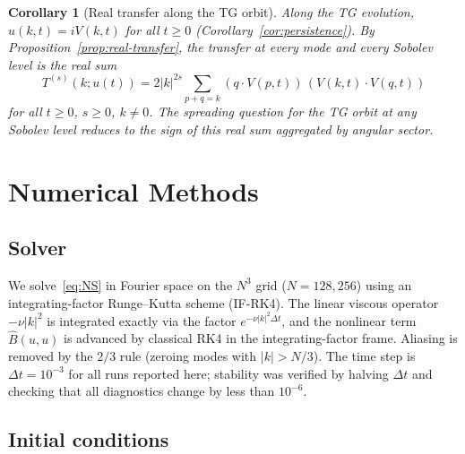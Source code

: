 \documentclass[11pt]{article}
\newtheorem{corollary}[theorem]{Corollary}
\theoremstyle{definition}
\begin{document}
\begin{corollary}[Real transfer along the TG orbit]
\label{cor:TG-real-orbit}
Along the TG evolution, $\hat u(k,t)=iV(k,t)$ for
all $t\geq 0$
(Corollary~\ref{cor:persistence}).
By Proposition~\ref{prop:real-transfer}, the transfer
at every mode and every Sobolev level is the real sum
\begin{equation}\label{eq:TG-orbit-transfer}
T^{(s)}(k;u(t)) = 2|k|^{2s}\sum_{p+q=k}
(q\cdot V(p,t))\,(V(k,t)\cdot V(q,t))
\end{equation}
for all $t\geq 0$, $s\geq 0$, $k\neq 0$.
The spreading question for the TG orbit at any
Sobolev level reduces to the sign of this real sum
aggregated by angular sector.
\end{corollary}

\section{Numerical Methods}
\label{sec:method}

\subsection{Solver}

We solve~\eqref{eq:NS} in Fourier space on the
$N^3$ grid ($N=128,256$) using an integrating-factor
Runge--Kutta scheme (IF-RK4).  The linear viscous
operator $-\nu|k|^2$ is integrated exactly via the
factor $e^{-\nu|k|^2\Delta t}$, and the nonlinear term
$\hat B(u,u)$ is advanced by classical RK4 in the
integrating-factor frame.  Aliasing is removed by the
$2/3$ rule (zeroing modes with $|k|>N/3$).  The time
step is $\Delta t = 10^{-3}$ for all runs reported here;
stability was verified by halving $\Delta t$ and checking
that all diagnostics change by less than $10^{-6}$.

\subsection{Initial conditions}
\end{document}
